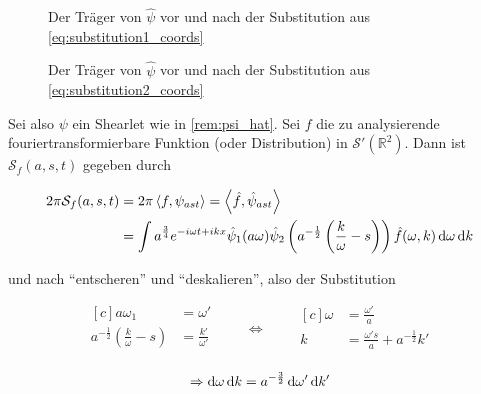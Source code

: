 \begin{figure}[h]
    \centering
    \begin{minipage}{0.5\textwidth}
        \centering
        \resizebox{\textwidth}{!}{} %
        \caption{Der Träger von $\hat\psi$ vor und nach der Substitution aus \cref{eq:substitution1_coords}}
        \label{fig:supp_psi_substitution1}
    \end{minipage}\hfill
    \begin{minipage}{0.5\textwidth}
        \centering
        \resizebox{\textwidth}{!}{}
        \caption{Der Träger von $\hat\psi$ vor und nach der Substitution aus \cref{eq:substitution2_coords}}
        \label{fig:supp_psi_substitution2}
    \end{minipage}
\end{figure}

Sei also $\psi$ ein Shearlet wie in \cref{rem:psi_hat}. Sei $f$ die zu
analysierende fouriertransformierbare Funktion (oder Distribution) in
$\mathcal{S}' (\mathbb{R}^2)$. Dann ist $\mathcal{S}_f (a,s,t)$ gegeben durch

\begin{align*}
2 \pi \mathcal{S}_f(a,s,t) &=
2 \pi \left<f, \psi_{ast}\right> = \left< \hat f, \hat\psi_{ast}\right> \\
 &= \int a^{\frac{3}{4}} e^{-i \omega t + ikx} \hat \psi_1(a \omega)
    \hat \psi_2 \left(a^{-\frac{1}{2}} \left(\frac{k}{\omega} - s\right)\right)
    \hat f (\omega,k) \mathop{}\!\mathrm{d} \omega \mathop{}\!\mathrm{d} k
\end{align*}

und nach "`entscheren"' und "`deskalieren"', also der Substitution

\begin{equation}
\begin{aligned}[c]
a \omega_1 &= \omega'\\
a^{-\frac{1}{2}} \left(\frac{k}{\omega} - s\right) &=\frac{k'}{\omega'}\\
\end{aligned}
\qquad\Longleftrightarrow\qquad
\begin{aligned}[c]
\omega &= \frac{\omega'}{a}\\
k &= \frac{\omega' s}{a} + a^{-\frac{1}{2}} k'\\
\end{aligned}
\label{eq:substitution1_coords}
\end{equation}

\begin{equation*}
\Rightarrow
\mathop{}\!\mathrm{d} \omega \mathop{}\!\mathrm{d} k = a^{-\frac{3}{2}} \mathop{}\!\mathrm{d} \omega' \mathop{}\!\mathrm{d} k'
\end{equation*}


